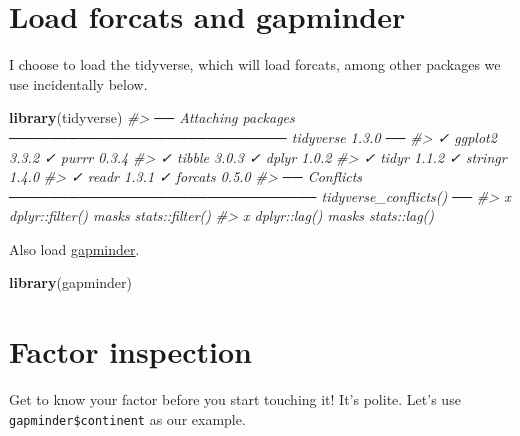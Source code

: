\documentclass[
]{book}
\newenvironment{Shaded}{\begin{snugshade}}{\end{snugshade}}
\newcommand{\CommentTok}[1]{\textcolor[rgb]{0.56,0.35,0.01}{\textit{#1}}}
\newcommand{\KeywordTok}[1]{\textcolor[rgb]{0.13,0.29,0.53}{\textbf{#1}}}
\newcommand{\NormalTok}[1]{#1}
\newcommand{\OperatorTok}[1]{\textcolor[rgb]{0.81,0.36,0.00}{\textbf{#1}}}
\begin{document}
\hypertarget{load-forcats-and-gapminder}{%
\section{Load forcats and gapminder}\label{load-forcats-and-gapminder}}

I choose to load the tidyverse, which will load forcats, among other packages we use incidentally below.

\begin{Shaded}
\begin{Highlighting}[]
\KeywordTok{library}\NormalTok{(tidyverse)}
\CommentTok{#> ── Attaching packages ──────────────────────────── tidyverse 1.3.0 ──}
\CommentTok{#> ✓ ggplot2 3.3.2     ✓ purrr   0.3.4}
\CommentTok{#> ✓ tibble  3.0.3     ✓ dplyr   1.0.2}
\CommentTok{#> ✓ tidyr   1.1.2     ✓ stringr 1.4.0}
\CommentTok{#> ✓ readr   1.3.1     ✓ forcats 0.5.0}
\CommentTok{#> ── Conflicts ─────────────────────────────── tidyverse_conflicts() ──}
\CommentTok{#> x dplyr::filter() masks stats::filter()}
\CommentTok{#> x dplyr::lag()    masks stats::lag()}
\end{Highlighting}
\end{Shaded}

Also load \href{https://github.com/jennybc/gapminder}{gapminder}.

\begin{Shaded}
\begin{Highlighting}[]
\KeywordTok{library}\NormalTok{(gapminder)}
\end{Highlighting}
\end{Shaded}

\hypertarget{factor-inspection}{%
\section{Factor inspection}\label{factor-inspection}}

Get to know your factor before you start touching it! It's polite. Let's use \texttt{gapminder\$continent} as our example.

\begin{Shaded}
\end{Shaded}
\end{document}
